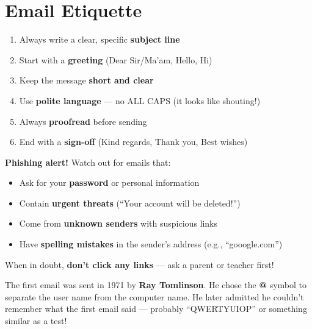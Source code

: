 \section{Email Etiquette}
\label{sec:etiquette}

\begin{enumerate}[label=\textcolor{ModuleBlue}{\textbf{\arabic*.}}, itemsep=3pt]
  \item Always write a clear, specific \textbf{subject line}
  \item Start with a \textbf{greeting} (Dear Sir/Ma'am, Hello, Hi)
  \item Keep the message \textbf{short and clear}
  \item Use \textbf{polite language} --- no ALL CAPS (it looks like shouting!)
  \item Always \textbf{proofread} before sending
  \item End with a \textbf{sign-off} (Kind regards, Thank you, Best wishes)
\end{enumerate}

\begin{warnbox}
\textbf{Phishing alert!} Watch out for emails that:
\begin{itemize}[leftmargin=*, itemsep=2pt]
  \item Ask for your \textbf{password} or personal information
  \item Contain \textbf{urgent threats} (``Your account will be deleted!'')
  \item Come from \textbf{unknown senders} with suspicious links
  \item Have \textbf{spelling mistakes} in the sender's address (e.g., ``gooogle.com'')
\end{itemize}
When in doubt, \textbf{don't click any links} --- ask a parent or teacher first!
\end{warnbox}


\begin{funfact}
The first email was sent in 1971 by \textbf{Ray Tomlinson}. He chose the \textbf{@} symbol to separate the user name from the computer name. He later admitted he couldn't remember what the first email said --- probably ``QWERTYUIOP'' or something similar as a test!
\end{funfact}

